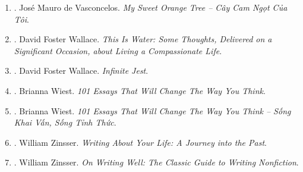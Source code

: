 \documentclass{article}
\begin{document}
\begin{enumerate}
	\item \cite{Vasconcelos_orange_tree}. Jos\'e Mauro de Vasconcelos. {\it My Sweet Orange Tree -- Cây Cam Ngọt Của Tôi}.\hfill{\sf[done]}
	
	\item \cite{Wallace_water}. David Foster Wallace. {\it This Is Water: Some Thoughts, Delivered on a Significant Occasion, about Living a Compassionate Life}.\hfill{\sf[done]}
	
	\item \cite{Wallace_jest}. David Foster Wallace. {\it Infinite Jest}.\hfill{\sf[reading]}
	
	\item \cite{Wiest_101_essays}. {\sc Brianna Wiest}. {\it 101 Essays That Will Change The Way You Think}.
	
	\item \cite{Wiest_101_essays_VN}. {\sc Brianna Wiest}. {\it 101 Essays That Will Change The Way You Think -- Sống Khai Vấn, Sống Tỉnh Thức}.\hfill{\sf[done]}
	
	\item \cite{Zinsser2005}. William Zinsser. {\it Writing About Your Life: A Journey into the Past}.
	
	\item \cite{Zinsser2016}. William Zinsser. {\it On Writing Well: The Classic Guide to Writing Nonfiction}.\hfill{\sf[reading]}
\end{enumerate}

\end{document}
